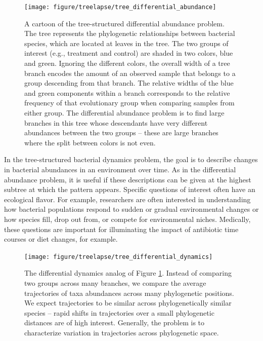 \begin{figure}
  \centering
  \texttt{[image: figure/treelapse/tree\_differential\_abundance]}
  \caption{A cartoon of the tree-structured differential abundance problem. The
    tree represents the phylogenetic relationships between bacterial species,
    which are located at leaves in the tree. The two groups of interest (e.g.,
    treatment and control) are shaded in two colors, blue and green. Ignoring
    the different colors, the overall width of a tree branch encodes the amount
    of an observed sample that belongs to a group descending from that branch.
    The relative widths of the blue and green components within a branch
    corresponds to the relative frequency of that evolutionary group when
    comparing samples from either group. The differential abundance problem is to
    find large branches in this tree whose descendants have very different
    abundances between the two groups -- these are large branches where the
    split between colors is not even.
    \label{fig:tree_differential_abundance} }
\end{figure}

In the tree-structured bacterial dynamics problem, the goal is to describe
changes in bacterial abundances in an environment over time. As in the
differential abundance problem, it is useful if these descriptions can be given
at the highest subtree at which the pattern appears. Specific questions of
interest often have an ecological flavor. For example, researchers are often
interested in understanding how bacterial populations respond to sudden or
gradual environmental changes or how species fill, drop out from, or compete for
environmental niches. Medically, these questions are important for illuminating
the impact of antibiotic time courses or diet changes, for example.

\begin{figure}
  \centering
  \texttt{[image: figure/treelapse/tree\_differential\_dynamics]}
  \caption{
    The differential dynamics analog of Figure
    \ref{fig:tree_differential_abundance}. Instead of comparing two groups
    across many branches, we compare the average trajectories of taxa abundances
    across many phylogenetic positions. We expect trajectories to be similar
    across phylogenetically similar species -- rapid shifts in trajectories over
    a small phylogenetic distances are of high interest. Generally, the problem
    is to characterize variation in trajectories across phylogenetic space.
    \label{fig:tree_differential_dynamics}}
\end{figure}

